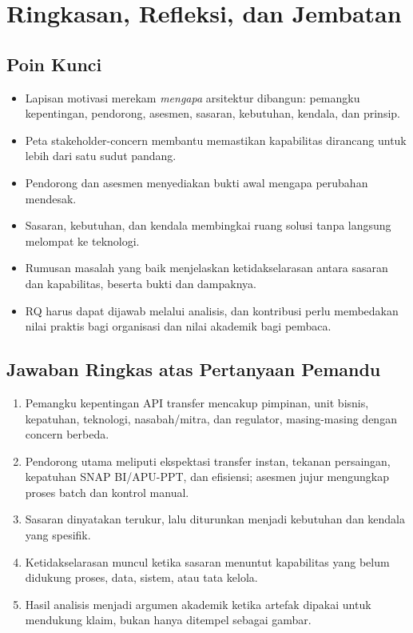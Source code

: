 \section{Ringkasan, Refleksi, dan Jembatan}

\subsection*{Poin Kunci}

\begin{itemize}
  \item Lapisan motivasi merekam \emph{mengapa} arsitektur dibangun: pemangku
        kepentingan, pendorong, asesmen, sasaran, kebutuhan, kendala, dan
        prinsip.
  \item Peta stakeholder-concern membantu memastikan kapabilitas dirancang
        untuk lebih dari satu sudut pandang.
  \item Pendorong dan asesmen menyediakan bukti awal mengapa perubahan mendesak.
  \item Sasaran, kebutuhan, dan kendala membingkai ruang solusi tanpa langsung
        melompat ke teknologi.
  \item Rumusan masalah yang baik menjelaskan ketidakselarasan antara sasaran
        dan kapabilitas, beserta bukti dan dampaknya.
  \item RQ harus dapat dijawab melalui analisis, dan kontribusi perlu membedakan
        nilai praktis bagi organisasi dan nilai akademik bagi pembaca.
\end{itemize}

\subsection*{Jawaban Ringkas atas Pertanyaan Pemandu}

\begin{enumerate}
  \item Pemangku kepentingan API transfer mencakup pimpinan, unit bisnis,
        kepatuhan, teknologi, nasabah/mitra, dan regulator, masing-masing dengan
        concern berbeda.
  \item Pendorong utama meliputi ekspektasi transfer instan, tekanan
        persaingan, kepatuhan SNAP BI/APU-PPT, dan efisiensi; asesmen jujur
        mengungkap proses batch dan kontrol manual.
  \item Sasaran dinyatakan terukur, lalu diturunkan menjadi kebutuhan dan
        kendala yang spesifik.
  \item Ketidakselarasan muncul ketika sasaran menuntut kapabilitas yang belum
        didukung proses, data, sistem, atau tata kelola.
  \item Hasil analisis menjadi argumen akademik ketika artefak dipakai untuk
        mendukung klaim, bukan hanya ditempel sebagai gambar.
\end{enumerate}

